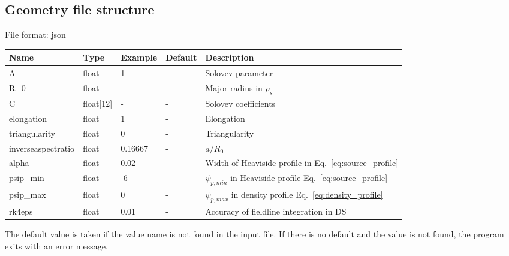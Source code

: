 \subsection{Geometry file structure}
File format: json

\begin{longtable}{llll>{\RaggedRight}p{7cm}}
\toprule
\rowcolor{gray!50}\textbf{Name} &  \textbf{Type} & \textbf{Example} & \textbf{Default} & \textbf{Description}  \\ \midrule
    A      & float & 1 &  - & Solovev parameter \\
    R\_0   & float & - & -  & Major radius in $\rho_s$ \\
    C      & float[12] &  - & - & Solovev coefficients \\
    elongation & float & 1 & - & Elongation \\
    triangularity & float & 0 & - & Triangularity \\
    inverseaspectratio & float & 0.16667 & - & $a/R_0$ \\
    alpha  & float & 0.02 & - & Width of Heaviside profile in Eq.~\eqref{eq:source_profile} \\
    psip\_min & float & -6 & - & $\psi_{p,min}$ in Heaviside profile Eq.~\eqref{eq:source_profile} \\
    psip\_max & float & 0 & - & $\psi_{p,max}$ in density profile Eq.~\eqref{eq:density_profile} \\
    rk4eps & float & 0.01 & - & Accuracy of fieldline integration in DS \\
\bottomrule
\end{longtable}
The default value is taken if the value name is not found in the input file. If there is no default and
the value is not found,
the program exits with an error message.

